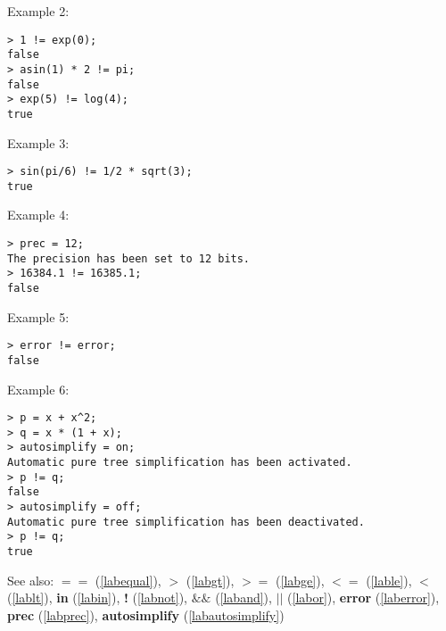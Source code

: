 \noindent Example 2: 
\begin{center}\begin{minipage}{15cm}\begin{Verbatim}[frame=single,commandchars=\\\|\~]
> 1 != exp(0);
false
> asin(1) * 2 != pi;
false
> exp(5) != log(4);
true
\end{Verbatim}
\end{minipage}\end{center}
\noindent Example 3: 
\begin{center}\begin{minipage}{15cm}\begin{Verbatim}[frame=single,commandchars=\\\|\~]
> sin(pi/6) != 1/2 * sqrt(3);
true
\end{Verbatim}
\end{minipage}\end{center}
\noindent Example 4: 
\begin{center}\begin{minipage}{15cm}\begin{Verbatim}[frame=single,commandchars=\\\|\~]
> prec = 12;
The precision has been set to 12 bits.
> 16384.1 != 16385.1;
false
\end{Verbatim}
\end{minipage}\end{center}
\noindent Example 5: 
\begin{center}\begin{minipage}{15cm}\begin{Verbatim}[frame=single,commandchars=\\\|\~]
> error != error;
false
\end{Verbatim}
\end{minipage}\end{center}
\noindent Example 6: 
\begin{center}\begin{minipage}{15cm}\begin{Verbatim}[frame=single,commandchars=\\\|\~]
> p = x + x^2;
> q = x * (1 + x);
> autosimplify = on;
Automatic pure tree simplification has been activated.
> p != q;
false
> autosimplify = off;
Automatic pure tree simplification has been deactivated.
> p != q;
true
\end{Verbatim}
\end{minipage}\end{center}
See also: \textbf{$==$} (\ref{labequal}), \textbf{$>$} (\ref{labgt}), \textbf{$>=$} (\ref{labge}), \textbf{$<=$} (\ref{lable}), \textbf{$<$} (\ref{lablt}), \textbf{in} (\ref{labin}), \textbf{!} (\ref{labnot}), \textbf{$\&\&$} (\ref{laband}), \textbf{$||$} (\ref{labor}), \textbf{error} (\ref{laberror}), \textbf{prec} (\ref{labprec}), \textbf{autosimplify} (\ref{labautosimplify})
